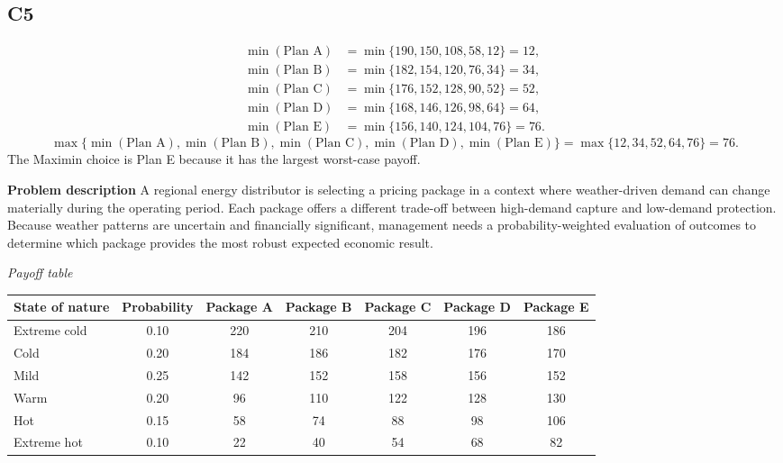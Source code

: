 \begin{ExamProblems}
		\subsection*{C5}
			\[
			\begin{aligned}
			\min(\text{Plan A}) &= \min\{190,150,108,58,12\} = 12,\\
			\min(\text{Plan B}) &= \min\{182,154,120,76,34\} = 34,\\
			\min(\text{Plan C}) &= \min\{176,152,128,90,52\} = 52,\\
			\min(\text{Plan D}) &= \min\{168,146,126,98,64\} = 64,\\
			\min(\text{Plan E}) &= \min\{156,140,124,104,76\} = 76.
			\end{aligned}
			\]
			\[
			\max\{\min(\text{Plan A}), \min(\text{Plan B}), \min(\text{Plan C}), \min(\text{Plan D}), \min(\text{Plan E})\}
			= \max\{12, 34, 52, 64, 76\}
			= 76.
			\]
			The Maximin choice is Plan E because it has the largest worst-case payoff.
		\item
		\textbf{Problem description}
		A regional energy distributor is selecting a pricing package in a context where weather-driven demand can change materially during the operating period. Each package offers a different trade-off between high-demand capture and low-demand protection. Because weather patterns are uncertain and financially significant, management needs a probability-weighted evaluation of outcomes to determine which package provides the most robust expected economic result.

		\begin{center}
			\textit{Payoff table}
			\begin{tabular}{l c c c c c c}
				\toprule
				State of nature & Probability & Package A & Package B & Package C & Package D & Package E \\
				\midrule
				Extreme cold & 0.10 & 220 & 210 & 204 & 196 & 186 \\
				Cold & 0.20 & 184 & 186 & 182 & 176 & 170 \\
				Mild & 0.25 & 142 & 152 & 158 & 156 & 152 \\
				Warm & 0.20 & 96 & 110 & 122 & 128 & 130 \\
				Hot & 0.15 & 58 & 74 & 88 & 98 & 106 \\
				Extreme hot & 0.10 & 22 & 40 & 54 & 68 & 82 \\
				\bottomrule
			\end{tabular}
		\end{center}


\end{ExamProblems}

